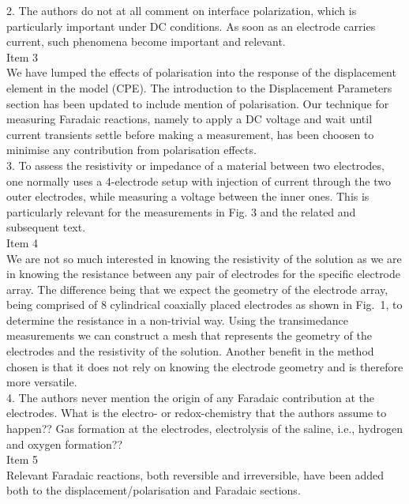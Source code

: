 \documentclass[journal, a4paper]{IEEEtran}
\begin{document}
{{2. The authors do not at all comment on interface polarization, which is particularly important under DC conditions. As soon as an electrode carries current, such phenomena become important and relevant.\\
{\color{OliveGreen}
    Item 3\\
    We have lumped the effects of polarisation into the response of the displacement element in the model (CPE). The introduction to the Displacement Parameters section has been updated to include mention of polarisation. Our technique for measuring Faradaic reactions, namely to apply a DC voltage and wait until current transients settle before making a measurement, has been choosen to minimise any contribution from polarisation effects.
}\\

3. To assess the resistivity or impedance of a material between two electrodes, one normally uses a 4-electrode setup with injection of current through the two outer electrodes, while measuring a voltage between the inner ones. This is particularly relevant for the measurements in Fig. 3 and the related and subsequent text.\\
{\color{OliveGreen} 
    Item 4\\
    We are not so much interested in knowing the resistivity of the solution as we are in knowing the resistance between any pair of electrodes for the specific electrode array. The difference being that we expect the geometry of the electrode array, being comprised of 8 cylindrical coaxially placed electrodes as shown in Fig.~1, to determine the resistance in a non-trivial way. Using the transimedance measurements we can construct a mesh that represents the geometry of the electrodes and the resistivity of the solution. Another benefit in the method chosen is that it does not rely on knowing the electrode geometry and is therefore more versatile.
}\\

4. The authors never mention the origin of any Faradaic contribution at the electrodes. What is the electro- or redox-chemistry that the authors assume to happen?? Gas formation at the electrodes, electrolysis of the saline, i.e., hydrogen and oxygen formation??\\
{\color{OliveGreen}
    Item 5\\
    Relevant Faradaic reactions, both reversible and irreversible, have been added both to the displacement/polarisation and Faradaic sections.
}\\

}}
\end{document}
